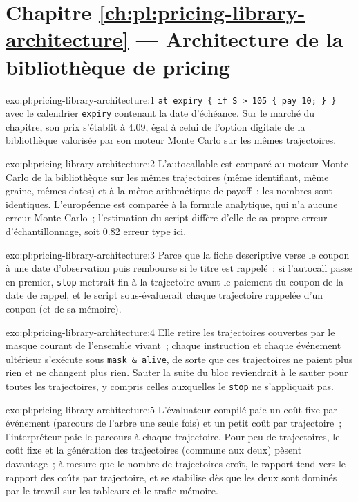 \section*{Chapitre \ref{ch:pl:pricing-library-architecture} --- Architecture de la bibliothèque de pricing}

\begin{solution}{exo:pl:pricing-library-architecture:1}
\texttt{at expiry \{ if S > 105 \{ pay 10; \} \}} avec le calendrier \texttt{expiry} contenant la date d'échéance. Sur le marché du chapitre, son prix s'établit à
4.09, égal à celui de l'option digitale de la bibliothèque valorisée par son moteur Monte Carlo sur les mêmes trajectoires.
\end{solution}

\begin{solution}{exo:pl:pricing-library-architecture:2}
L'autocallable est comparé au moteur Monte Carlo de la bibliothèque sur les mêmes trajectoires (même identifiant, même graine, mêmes dates) et à la même
arithmétique de payoff~: les nombres sont identiques. L'européenne est comparée à la formule analytique, qui n'a aucune erreur Monte Carlo~; l'estimation du script
diffère d'elle de sa propre erreur d'échantillonnage, soit 0.82 erreur type ici.
\end{solution}

\begin{solution}{exo:pl:pricing-library-architecture:3}
Parce que la fiche descriptive verse le coupon à une date d'observation puis rembourse si le titre est rappelé~: si l'autocall passe en premier, \texttt{stop}
mettrait fin à la trajectoire avant le paiement du coupon de la date de rappel, et le script sous-évaluerait chaque trajectoire rappelée d'un coupon (et de sa mémoire).
\end{solution}

\begin{solution}{exo:pl:pricing-library-architecture:4}
Elle retire les trajectoires couvertes par le masque courant de l'ensemble vivant~; chaque instruction et chaque événement ultérieur s'exécute sous \texttt{mask \& alive}, de sorte que ces
trajectoires ne paient plus rien et ne changent plus rien. Sauter la suite du bloc reviendrait à le sauter pour toutes les trajectoires, y compris celles auxquelles le \texttt{stop}
ne s'appliquait pas.
\end{solution}

\begin{solution}{exo:pl:pricing-library-architecture:5}
L'évaluateur compilé paie un coût fixe par événement (parcours de l'arbre une seule fois) et un petit coût par trajectoire~; l'interpréteur paie le parcours à chaque trajectoire. Pour
peu de trajectoires, le coût fixe et la génération des trajectoires (commune aux deux) pèsent davantage~; à mesure que le nombre de trajectoires croît, le rapport tend vers le rapport des coûts par trajectoire, et
se stabilise dès que les deux sont dominés par le travail sur les tableaux et le trafic mémoire.
\end{solution}

